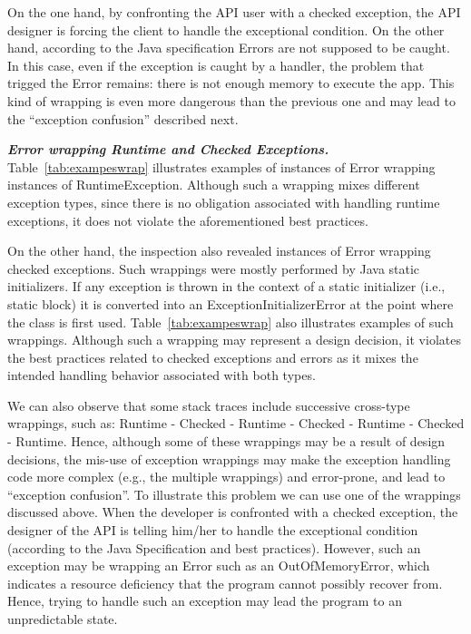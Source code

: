 {On the one hand, by confronting the API user with a checked exception,
the API designer is forcing the client to handle the exceptional condition.
On the other hand, according to the Java specification Errors are not supposed to be
caught. In this case, even if the exception is caught by a handler, the problem 
that trigged the Error remains: there is not enough memory to execute the app.
This kind of wrapping is even more dangerous than the previous one
and may lead to the ``exception confusion'' described next.

\emph{\textbf{Error wrapping Runtime and Checked Exceptions.}} Table~\ref{tab:exampeswrap}  illustrates
examples of instances of Error wrapping instances of
RuntimeException.
Although such a wrapping mixes different exception types,
since there is no obligation associated with handling runtime exceptions, it
does not violate the aforementioned best practices.

On the other hand, the inspection
also revealed instances of Error wrapping checked exceptions. Such wrappings were
mostly performed by Java static initializers. If any exception is thrown in the context of a static initializer
(i.e., static block)  it is converted into an ExceptionInitializerError
at the point where the class is first used.  Table~\ref{tab:exampeswrap} also illustrates
examples of such wrappings. Although such a wrapping may represent a design decision,
it violates the best practices related to checked exceptions and errors as it mixes the intended handling
behavior associated with both types.

We can also observe that some stack traces include successive cross-type wrappings,
such as: Runtime - Checked - Runtime - Checked - Runtime - Checked -
Runtime.
Hence, although some of these wrappings may be a result of design decisions, the mis-use of exception wrappings may make the exception handling
code more complex (e.g., the multiple wrappings) and error-prone,
 and lead to ``exception confusion''. To illustrate this problem we can use one of the wrappings discussed above.
When the developer is confronted with a checked exception, the designer of the API is telling him/her
to handle the exceptional condition (according to the Java Specification and
best practices). However, such an exception may be wrapping an Error such
as an OutOfMemoryError, which indicates a resource deficiency
that the program cannot possibly recover from. Hence, trying to
handle such an exception
may lead the program to an unpredictable state.

}
